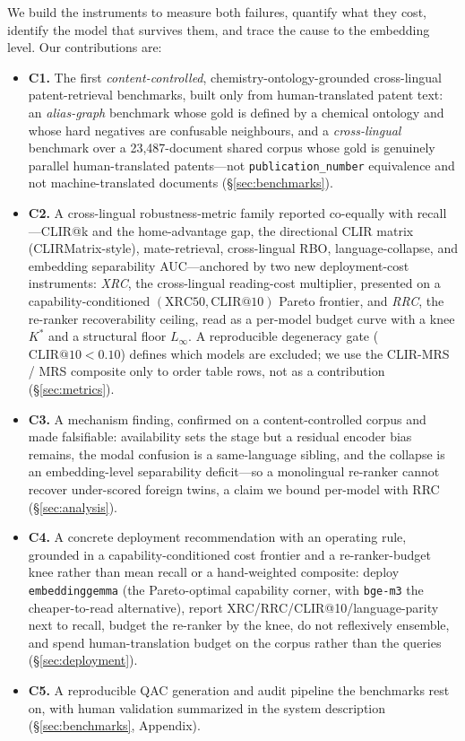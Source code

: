 \documentclass[11pt]{article}
\begin{document}
We build the instruments to measure both failures, quantify what they cost,
identify the model that survives them, and trace the cause to the embedding
level. Our contributions are:

\begin{itemize}
  \item \textbf{C1.} The first \emph{content-controlled},
  chemistry-ontology-grounded cross-lingual patent-retrieval benchmarks, built
  only from human-translated patent text: an \emph{alias-graph} benchmark whose
  gold is defined by a chemical ontology and whose hard negatives are confusable
  neighbours, and a \emph{cross-lingual} benchmark over a 23{,}487-document
  shared corpus whose gold is genuinely parallel human-translated patents---not
  \texttt{publication\_number} equivalence and not machine-translated documents
  (\S\ref{sec:benchmarks}).
  \item \textbf{C2.} A cross-lingual robustness-metric family reported
  co-equally with recall---CLIR@k and the home-advantage gap, the directional
  CLIR matrix (CLIRMatrix-style), mate-retrieval, cross-lingual RBO,
  language-collapse, and embedding separability AUC---anchored by two new
  deployment-cost instruments: \emph{XRC}, the cross-lingual reading-cost
  multiplier, presented on a capability-conditioned $(\mathrm{XRC50},
  \mathrm{CLIR@10})$ Pareto frontier, and \emph{RRC}, the re-ranker
  recoverability ceiling, read as a per-model budget curve with a knee $K^{\!*}$
  and a structural floor $L_\infty$. A reproducible degeneracy gate
  ($\mathrm{CLIR@10}<0.10$) defines which models are excluded; we use the
  CLIR-MRS / MRS composite only to order table rows, not as a contribution
  (\S\ref{sec:metrics}).
  \item \textbf{C3.} A mechanism finding, confirmed on a content-controlled
  corpus and made falsifiable: availability sets the stage but a residual
  encoder bias remains, the modal confusion is a same-language sibling, and the
  collapse is an embedding-level separability deficit---so a monolingual
  re-ranker cannot recover under-scored foreign twins, a claim we bound
  per-model with RRC (\S\ref{sec:analysis}).
  \item \textbf{C4.} A concrete deployment recommendation with an operating
  rule, grounded in a capability-conditioned cost frontier and a re-ranker-budget
  knee rather than mean recall or a hand-weighted composite: deploy
  \texttt{embeddinggemma} (the Pareto-optimal capability corner, with
  \texttt{bge-m3} the cheaper-to-read alternative), report
  XRC/RRC/CLIR@10/language-parity next to recall, budget the re-ranker by the
  knee, do not reflexively ensemble, and spend human-translation budget on the
  corpus rather than the queries (\S\ref{sec:deployment}).
  \item \textbf{C5.} A reproducible QAC generation and audit pipeline the
  benchmarks rest on, with human validation summarized in the system
  description (\S\ref{sec:benchmarks}, Appendix).
\end{itemize}
\end{document}
